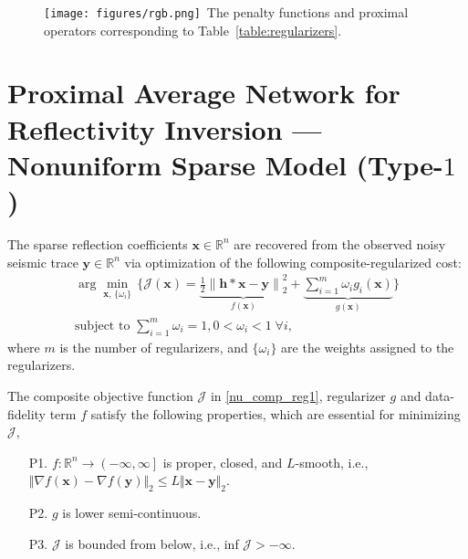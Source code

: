 \documentclass[journal]{IEEEtran}
\newcommand{\rgbsymbol}{\texttt{[image: figures/rgb.png]}}
\begin{document}

\begin{figure*}[!t]
    \vskip 0.2in
    \centering
    \caption{\protect\rgbsymbol~The penalty functions and proximal operators corresponding to Table~\ref{table:regularizers}.}
    \label{fig:regularizers}
\end{figure*}

\section{Proximal Average Network for Reflectivity Inversion --- Nonuniform Sparse Model (Type-\texorpdfstring{$1$}{1})}
\label{sec:nu_span1}

The sparse reflection coefficients $\boldsymbol{x} \in \mathbb{R}^n$ are recovered from the observed noisy seismic trace $\boldsymbol{y} \in \mathbb{R}^n$ via optimization of the following composite-regularized cost:
\begin{equation}\label{nu_comp_reg1}
\begin{split}
    \arg\min_{\boldsymbol{x}, \, \{\omega_{i}\}} \, \Big\{\mathcal{J(\boldsymbol{x})} = \underbrace{\frac{1}{2}{\left\| \boldsymbol{h}*\boldsymbol{x}-\boldsymbol{y} \right\|}_{2}^{2}}_{f(\boldsymbol{x})} + \underbrace{\sum\limits_{i = 1}^m \omega_{i}{ g_{i}(\boldsymbol{x}) }}_{g(\boldsymbol{x})}\Big\} \\
    \text{subject to} \, \, \sum\limits_{i=1}^m {\omega_{i}=1}, 0<\omega_{i}<1 \; \forall{i},
\end{split}
\end{equation}%
where $m$ is the number of regularizers, and $\{\omega_{i}\}$ are the weights assigned to the regularizers.

The composite objective function $\mathcal{J}$ in \eqref{nu_comp_reg1}, regularizer $g$ and data-fidelity term $f$ satisfy the following properties, which are essential for minimizing $\mathcal{J}$,
\begin{enumerate}
	\item[P1.] $f : \mathbb{R}^{n} \rightarrow \left (- \infty,\infty \right] $ is proper, closed, and $L$-smooth, i.e., $\Vert \nabla f(\boldsymbol{x}) - \nabla f(\boldsymbol{y})\Vert_{2} \leq L \Vert \boldsymbol{x} - \boldsymbol{y}\Vert_{2}$.
	\item[P2.] $g$ is lower semi-continuous.
	\item[P3.] $\mathcal{J}$ is bounded from below, i.e., inf $\mathcal{J} > -\infty$.
\end{enumerate}
\end{document}

